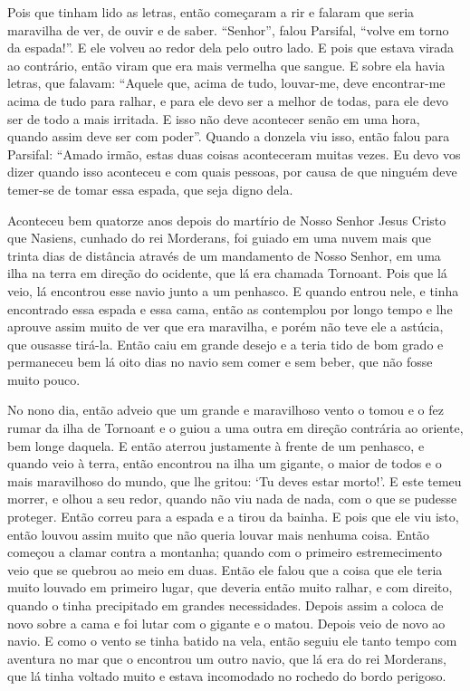  Pois que tinham lido as letras, então começaram a rir e falaram que seria
maravilha de ver, de ouvir e de saber. “Senhor”, falou Parsifal, “volve em
torno da espada!”. E ele volveu ao redor dela pelo outro lado. E pois que
estava virada ao contrário, então viram que era mais vermelha que sangue. E
sobre ela havia letras, que falavam: “Aquele que, acima de tudo, louvar-me,
deve encontrar-me acima de tudo para ralhar, e para ele devo ser a melhor de
todas, para ele devo ser de todo a mais irritada. E isso não deve acontecer
senão em uma hora, quando assim deve ser com poder”. Quando a donzela viu isso,
então falou para Parsifal: “Amado irmão, estas duas coisas aconteceram muitas
vezes. Eu devo vos dizer quando isso aconteceu e com quais pessoas, por causa
de que ninguém deve temer-se de tomar essa espada, que seja digno dela.

 Aconteceu bem quatorze anos depois do martírio de Nosso Senhor Jesus Cristo que
Nasiens, cunhado do rei Morderans, foi guiado em uma nuvem mais que trinta dias
de distância através de um mandamento de Nosso Senhor, em uma ilha na terra em
direção do ocidente, que lá era chamada Tornoant. Pois que lá veio, lá
encontrou esse navio junto a um penhasco. E quando entrou nele, e tinha
encontrado essa espada e essa cama, então as contemplou por longo tempo e lhe
aprouve assim muito de ver que era maravilha, e porém não teve ele a astúcia,
que ousasse tirá-la. Então caiu em grande desejo e a teria tido de bom grado e
permaneceu bem lá oito dias no navio sem comer e sem beber, que não fosse muito
pouco.

No nono dia, então adveio que um grande e maravilhoso vento o tomou e o fez
rumar da ilha de Tornoant e o guiou a uma outra em direção contrária ao
oriente, bem longe daquela. E então aterrou justamente à frente de um penhasco,
e quando veio à terra, então encontrou na ilha um gigante, o maior de todos e o
mais maravilhoso do mundo, que lhe gritou: ‘Tu deves estar morto!’. E este
temeu morrer, e olhou a seu redor, quando não viu nada de nada, com o que se
pudesse proteger. Então correu para a espada e a tirou da bainha. E pois que
ele viu isto, então louvou assim muito que não queria louvar mais nenhuma
coisa. Então começou a clamar contra a montanha; quando com o primeiro
estremecimento veio que se quebrou ao meio em duas. Então ele falou que a coisa
que ele teria muito louvado em primeiro lugar, que deveria então muito ralhar,
e com direito, quando o tinha precipitado em grandes necessidades. Depois assim
a coloca de novo sobre a cama e foi lutar com o gigante e o matou. Depois veio
de novo ao navio. E como o vento se tinha batido na vela, então seguiu ele
tanto tempo com aventura no mar que o encontrou um outro navio, que lá era do
rei Morderans, que lá tinha voltado muito e estava incomodado no rochedo do
bordo perigoso. 


